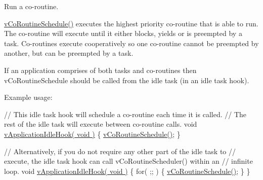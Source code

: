 Run a co-\/routine.

\hyperlink{externals_2freertos_2include_2croutine_8h_a5333c649a2c063006ca3cd7a3b5b9240}{v\+Co\+Routine\+Schedule()} executes the highest priority co-\/routine that is able to run. The co-\/routine will execute until it either blocks, yields or is preempted by a task. Co-\/routines execute cooperatively so one co-\/routine cannot be preempted by another, but can be preempted by a task.

If an application comprises of both tasks and co-\/routines then v\+Co\+Routine\+Schedule should be called from the idle task (in an idle task hook).

Example usage\+: 
\begin{DoxyPre}
// This idle task hook will schedule a co-routine each time it is called.
// The rest of the idle task will execute between co-routine calls.
void \hyperlink{support_8c_a97fd430f36f8b065226e2bff9bad1de5}{vApplicationIdleHook( void )}
\{
   \hyperlink{externals_2freertos_2include_2croutine_8h_a5333c649a2c063006ca3cd7a3b5b9240}{vCoRoutineSchedule()};
\}\end{DoxyPre}



\begin{DoxyPre}// Alternatively, if you do not require any other part of the idle task to
// execute, the idle task hook can call vCoRoutineScheduler() within an
// infinite loop.
void \hyperlink{support_8c_a97fd430f36f8b065226e2bff9bad1de5}{vApplicationIdleHook( void )}
\{
   for( ;; )
   \{
       \hyperlink{externals_2freertos_2include_2croutine_8h_a5333c649a2c063006ca3cd7a3b5b9240}{vCoRoutineSchedule()};
   \}
\}
\end{DoxyPre}
 